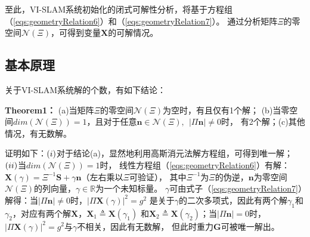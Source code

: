 \documentclass{article}
\begin{document}
\par
至此，VI-SLAM系统初始化的闭式可解性分析，将基于方程组（\ref{eqs:geometryRelation6}）和（\ref{eqs:geometryRelation7}）。
通过分析矩阵$\Xi$的零空间$\mathcal{N}(\Xi)$，可得到变量$\textbf{X}$的可解情况。

\subsection{基本原理}
关于VI-SLAM系统解的个数，有如下结论：
\par
\textbf{Theorem1：} (a)当矩阵$\Xi$的零空间$\mathcal{N}(\Xi)$为空时，有且仅有1个解；
(b)当零空间$dim(\mathcal{N}(\Xi))=1$，且对于任意$\textbf{n}\in\mathcal{N}(\Xi),\ \ |\Pi\textbf{n}|\not=0$时，
有2个解；(c)其他情况，有无数解。
\par
证明如下：$(\romannumeral1)$对于结论(a)，显然地利用高斯消元法解方程组，可得到唯一解；$(\romannumeral2)$当$dim(\mathcal{N}(\Xi))=1$时，
线性方程组（\ref{eqs:geometryRelation6}）有解：$\textbf{X}(\gamma)=\Xi^{-1}\textbf{S}+\gamma\textbf{n}$（左右乘以$\Xi$可验证），
其中$\Xi^{-1}$为$\Xi$的伪逆，$\textbf{n}$为零空间$\mathcal{N}(\Xi)$的列向量，$\gamma\in\mathbb{R}$为一个未知标量。
$\gamma$可由式子（\ref{eqs:geometryRelation7}）解得：当$|\Pi\textbf{n}|\not=0$时，$|\Pi\textbf{X}(\gamma)|^2=g^2$
是关于$\gamma$的二次多项式，因此有两个解$\gamma_1$和$\gamma_2$，对应有两个解$\textbf{X}$，$\textbf{X}_1\triangleq \textbf{X}(\gamma_1)$
和$\textbf{X}_2\triangleq \textbf{X}(\gamma_2)$；当$|\Pi\textbf{n}|=0$时，$|\Pi\textbf{X}(\gamma)|^2=g^2$与$\gamma$不相关，因此有无数解，
但此时重力$\textbf{G}$可被唯一解出。
\end{document}

